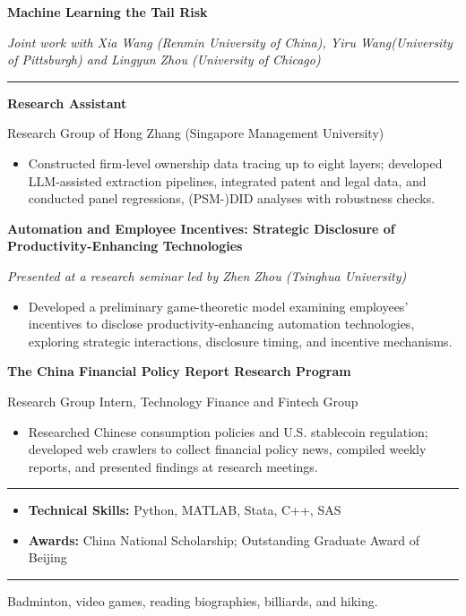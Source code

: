 \documentclass[10pt,letterpaper]{article}
\newcommand{\sectiontitle}[1]{\vspace{0.085in}{\large\bfseries #1}\par\vspace{-3pt}\rule{\textwidth}{0.4pt}\par\vspace{0.04in}}
\newcommand{\projentry}[1]{\textbf{#1}\par}
\begin{document}
\projentry{Machine Learning the Tail Risk}
\textit{Joint work with Xia Wang (Renmin University of China), Yiru Wang(University of Pittsburgh) and Lingyun Zhou (University of Chicago)}





\sectiontitle{RESEARCH EXPERIENCE}



\projentry{Research Assistant}
{Research Group of Hong Zhang (Singapore Management University)}
\begin{itemize}
    \item Constructed firm-level ownership data
    tracing up to eight layers; developed LLM-assisted
    extraction pipelines, integrated patent and legal
    data, and conducted panel regressions, (PSM-)DID analyses with robustness checks.
\end{itemize}

\projentry{Automation and Employee Incentives: Strategic Disclosure of Productivity-Enhancing Technologies}
\textit{Presented at a research seminar led by Zhen Zhou (Tsinghua University)}
\begin{itemize}
 \item Developed a preliminary game-theoretic model examining employees' incentives to disclose productivity-enhancing automation technologies, exploring strategic interactions, disclosure timing, and incentive mechanisms.
\end{itemize}


\projentry{The China Financial Policy Report Research Program}
{Research Group Intern, Technology Finance and Fintech Group}
\begin{itemize}
    \item Researched Chinese consumption policies and
    U.S. stablecoin regulation; developed web crawlers
    to collect financial policy news, compiled weekly
    reports, and presented findings at research meetings.
\end{itemize}


\sectiontitle{TECHNICAL SKILLS AND AWARDS}
\begin{itemize}
 \item \textbf{Technical Skills:} Python, MATLAB, Stata, C++, SAS
 \item \textbf{Awards:} China National Scholarship; Outstanding Graduate Award of Beijing
\end{itemize}
\sectiontitle{INTERESTS}
Badminton, video games, reading biographies, billiards, and hiking.
\end{document}
